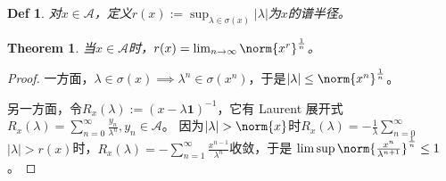 \documentclass{ctexart}
\newtheorem{definition}{Def}
\newtheorem{theorem}{Theorem}
\begin{document}
\begin{definition}\label{def:shc_riduas}
  对\(x \in \mathcal{A}\)，定义\(r(x):= \sup_{\lambda \in \sigma(x)}|\lambda| \)为\(x \)的谱半径。
\end{definition}

\begin{theorem}\label{the:shc_riduas}
  当\(x \in \mathcal{A} \)时，\(r(x) = \lim_{n \to \infty}\norm{x^r}^{\frac{1}{n}} \)。
\end{theorem}
\begin{proof}
  一方面，\(\lambda \in \sigma(x) \implies \lambda^n \in \sigma(x^n) \)，于是\(|\lambda| \leq \norm{x^n}^{\frac{1}{n}} \)。

  另一方面，令\(R_x(\lambda):= (x - \lambda \mathbf{1})^{-1} \)，它有 Laurent 展开式\(R_x(\lambda) = \sum_{n = 0}^{\infty}\frac{y_n}{\lambda^n},y_n \in \mathcal{A} \)。
  因为\(|\lambda| > \norm{x} \)时\(R_x(\lambda) = -\frac{1}{\lambda} \sum_{n = 0}^{\infty} \)
  \(|\lambda| > r(x) \)时，\(R_x(\lambda) = -\sum_{n = 1}^{\infty}\frac{x^{n - 1}}{\lambda^n} \)收敛，于是
  \(\limsup \norm{\frac{x^n}{\lambda^{n + 1}}}^{\frac{1}{n}} \leq 1 \)。
\end{proof}
\end{document}
